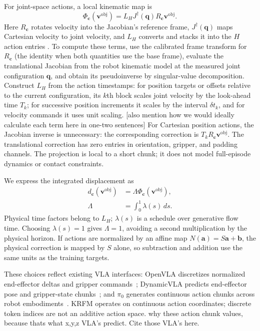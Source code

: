 \documentclass[10pt,twocolumn,letterpaper]{article}
\newcommand{\EditAP}[1]{{\color{blue} #1}}
\begin{document}
For joint-space actions, a local kinematic map is
\begin{equation}
    \Phi_{\mathbf c}(\mathbf v^{\mathrm{obj}})
    =L_H J^\dagger(\mathbf q)R_{\mathbf c}\mathbf v^{\mathrm{obj}}.
    \label{eq:kinematic_projection}
\end{equation}
Here $R_{\mathbf c}$ rotates velocity into the Jacobian's reference frame,
$J^\dagger(\mathbf q)$ maps Cartesian velocity to joint velocity, and $L_H$
converts and stacks it into the $H$ action entries
\citep{nakamura1991advanced,siciliano2009robotics}.
To compute these terms, use the calibrated frame transform for
$R_{\mathbf c}$ (the identity when both quantities use the base frame),
evaluate the translational Jacobian from the robot kinematic model at the
measured joint configuration $\mathbf q$, and obtain its pseudoinverse by
singular-value decomposition.
Construct $L_H$ from the action timestamps: for position targets or offsets
relative to the current configuration, its $k$th block scales joint velocity
by the look-ahead time $T_k$; for successive position increments it scales by
the interval $\delta t_k$, and for velocity commands it uses unit scaling.
\EditAP{[also mention how we would ideally calculate each term here in one-two sentences]}
For Cartesian position actions, the Jacobian inverse is unnecessary:
the corresponding correction is $T_k R_{\mathbf c}\mathbf v^{\mathrm{obj}}$.
The translational correction has zero entries in orientation, gripper, and
padding channels. The projection is local to a short chunk; it does not
model full-episode dynamics or contact constraints.

We express the integrated displacement as
\begin{align}
    d_{\mathbf c}(\mathbf v^{\mathrm{obj}})
    &=\Lambda\Phi_{\mathbf c}(\mathbf v^{\mathrm{obj}}), \\
    \Lambda&=\int_0^1\lambda(s)\,ds.
    \label{eq:integrated_velocity_displacement}
\end{align}
Physical time factors belong to $L_H$; $\lambda(s)$ is a schedule over
generative flow time. Choosing $\lambda(s)=1$ gives $\Lambda=1$, avoiding a
second multiplication by the physical horizon.
If actions are normalized by an affine map $N(\mathbf a)=S\mathbf a+\mathbf b$,
the physical correction is mapped by $S$ alone, so subtraction and addition
use the same units as the training targets.

These choices reflect existing VLA interfaces: OpenVLA discretizes normalized
end-effector deltas and gripper commands~\citep{kim2024openvla}; DynamicVLA
predicts end-effector pose and gripper-state chunks~\citep{xie2026dynamicvla};
and $\pi_0$ generates continuous action chunks across robot
embodiments~\citep{black2025pi0}. KRFM operates on continuous action
coordinates; discrete token indices are not an additive action space.
\EditAP{why these action chunk values, because thats what x,y,z VLA's predict. Cite those VLA's here.}
\end{document}
